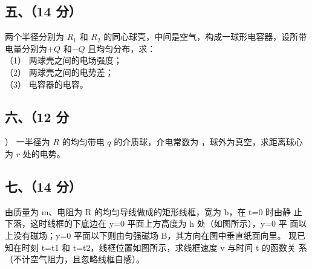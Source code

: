 \subsection{五、（14 分）}
两个半径分别为 $R_1$ 和 $R_2$ 的同心球壳，中间是空气，构成一球形电容器，设所带电量分别为$+Q$ 和$-Q$ 且均匀分布，求：\\
（1） 两球壳之间的电场强度；\\
（2） 两球壳之间的电势差；\\
（3） 电容器的电容。
\subsection{六、（12 分}）
一半径为 $R$ 的均匀带电 $q$ 的介质球，介电常数为 ，球外为真空，求距离球心为 $r$ 处的电势。
\subsection{七、（14 分）}
由质量为 m、电阻为 R 的均匀导线做成的矩形线框，宽为 b，在 t=0 时由静
止下落，这时线框的下底边在 y=0 平面上方高度为 h 处（如图所示），y=0 平
面以上没有磁场；y=0 平面以下则由匀强磁场 B，其方向在图中垂直纸面向里。
现已知在时刻 t=t1 和 t=t2，线框位置如图所示，求线框速度 v 与时间 t 的函数关
系（不计空气阻力，且忽略线框自感）。